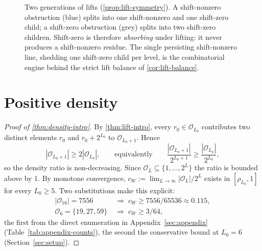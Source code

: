 \documentclass[11pt,reqno]{amsart}
\newcommand{\Obs}{\mathcal{O}}
\begin{document}
\begin{figure}[ht]
\centering
{}
\caption{Two generations of lifts (\cref{prop:lift-symmetry}). A
shift-nonzero obstruction (blue) splits into one shift-nonzero and one
shift-zero child; a shift-zero obstruction (grey) splits into two shift-zero
children. Shift-zero is therefore \emph{absorbing} under lifting: it never
produces a shift-nonzero residue. The single persisting shift-nonzero line,
shedding one shift-zero child per level, is the combinatorial engine behind
the strict lift balance of \cref{cor:lift-balance}.}
\label{fig:lift-tree}
\end{figure}

\section{Positive density}
\label{sec:density}

\begin{proof}[Proof of \cref{thm:density-intro}]
By \cref{thm:lift-intro}, every $r_0 \in \Obs_{L_0}$ contributes two
distinct elements $r_0$ and $r_0 + 2^{L_0}$ to $\Obs_{L_0+1}$. Hence
\[
|\Obs_{L_0+1}| \ge 2 |\Obs_{L_0}|,
\qquad\text{equivalently}\qquad
\frac{|\Obs_{L_0+1}|}{2^{L_0+1}} \ge \frac{|\Obs_{L_0}|}{2^{L_0}},
\]
so the density ratio is non-decreasing. Since
$\Obs_L \subseteq \{1, \ldots, 2^L\}$ the ratio is bounded above by $1$. By
monotone convergence,
$c_W := \lim_{L \to \infty} |\Obs_L|/2^L$ exists in $[\rho_{L_0}, 1]$ for every
$L_0 \ge 5$. Two substitutions make this explicit:
\[
\begin{aligned}
|\Obs_{16}| = 7556 &\;\Rightarrow\; c_W \ge 7556/65536 \approx 0.115, \\
\Obs_6 = \{19, 27, 59\} &\;\Rightarrow\; c_W \ge 3/64,
\end{aligned}
\]
the first from the direct enumeration in Appendix~\ref{sec:appendix}
(Table~\ref{tab:appendix-counts}), the second the conservative bound at
$L_0 = 6$ (Section~\ref{sec:setup}). \qedhere
\end{proof}
\end{document}
